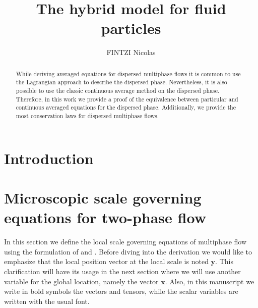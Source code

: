 \documentclass[twocolumn]{My_article}
\title{The hybrid model for fluid particles}
\author{FINTZI Nicolas}
\begin{document}
\maketitle
\begin{abstract}
    While deriving averaged equations for dispersed multiphase flows it is common to use the Lagrangian approach to describe the dispersed phase.
    Nevertheless, it is also possible to use the classic continuous average method on the dispersed phase.
    Therefore, in this work we provide a proof of the equivalence between particular and continuous averaged equations for the dispersed phase.
    Additionally, we provide the most conservation laws for dispersed multiphase flows.
\end{abstract}
\section{Introduction}
\section{Microscopic scale governing equations for two-phase flow}
\label{sec:conservation_laws}

In this section we define the local scale governing equations of multiphase flow using the formulation of \citet{kataoka1986local} and \citet{drew1983mathematical}.
Before diving into the derivation we would like to emphasize that the local position vector at the local scale is noted $\textbf{y}$.
This clarification will have its usage in the next section where we will use another variable for the global location, namely the vector $\textbf{x}$.
Also, in this manuscript we write in bold symbols the vectors and tensors, while the scalar variables are written with the usual font.
\end{document}
